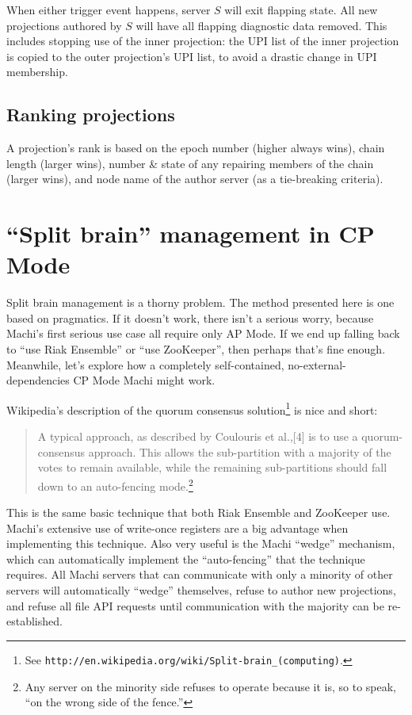 \documentclass[preprint,10pt]{sigplanconf}
\begin{document}
When either trigger event happens, server $S$ will exit flapping state.  All
new projections authored by $S$ will have all flapping diagnostic data
removed.  This includes stopping use of the inner projection: the UPI
list of the inner projection is copied to the outer projection's UPI
list, to avoid a drastic change in UPI membership.

\subsection{Ranking projections}
\label{sub:ranking-projections}

A projection's rank is based on the epoch number (higher always wins),
chain length (larger wins), number \& state of any repairing members
of the chain (larger wins), and node name of the author server (as a
tie-breaking criteria).

\section{``Split brain'' management in CP Mode}
\label{sec:split-brain-management}

Split brain management is a thorny problem.  The method presented here
is one based on pragmatics.  If it doesn't work, there isn't a serious
worry, because Machi's first serious use case all require only AP Mode.
If we end up falling back to ``use Riak Ensemble'' or ``use ZooKeeper'',
then perhaps that's
fine enough.  Meanwhile, let's explore how a
completely self-contained, no-external-dependencies
CP Mode Machi might work.

Wikipedia's description of the quorum consensus solution\footnote{See
  {\tt http://en.wikipedia.org/wiki/Split-brain\_(computing)}.} is nice
and short:

\begin{quotation}
A typical approach, as described by Coulouris et al.,[4] is to use a
quorum-consensus approach. This allows the sub-partition with a
majority of the votes to remain available, while the remaining
sub-partitions should fall down to an auto-fencing mode.\footnote{Any
  server on the minority side refuses to operate
  because it is, so to speak, ``on the wrong side of the fence.''}
\end{quotation}

This is the same basic technique that
both Riak Ensemble and ZooKeeper use.  Machi's
extensive use of write-once registers are a big advantage when implementing
this technique.  Also very useful is the Machi ``wedge'' mechanism,
which can automatically implement the ``auto-fencing'' that the
technique requires.  All Machi servers that can communicate with only
a minority of other servers will automatically ``wedge'' themselves,
refuse to author new projections, and
refuse all file API requests until communication with the
majority can be re-established.
\end{document}
